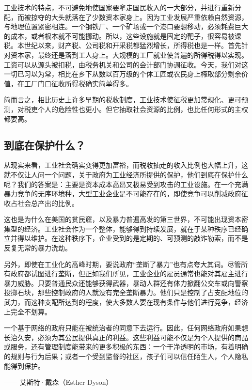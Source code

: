 工业技术的特点，不可避免地使国家要拿走国民收入的一大部分，并进行重新分配，而被掠夺的大头就落在了少数资本家身上。因为工业发展严重依赖自然资源，与地理位置紧密相连。一个钢铁厂、一个矿场或一个港口要想移动，必须耗费巨大的成本，或者根本就不可能挪动。所以，这些设施就是固定的靶子，很容易被课税。本世纪以来，财产税、公司税和开采税都猛烈增长，所得税也是一样。首先针对资本家，最终还是落到工人身上。大规模的工厂就业使普遍的所得税得以实现。工资可以从源头被扣税，由税务机关和公司的会计部门协调征收。今天，我们对这一切已习以为常，相比在乡下从数以百万级的个体工匠或农民身上榨取部分剩余价值，在工厂门口征收所得税确实简单得多。

简而言之，相比历史上许多早期的税收制度，工业技术使征税更加常规化、更可预测，对税吏个人的危险性也更小。但它抽取社会资源的比例，也比任何形式的主权都要高。

\subsection{到底在保护什么？}
从现实来看，工业社会确实变得更加富裕，而税收抽走的收入比例也大幅上升，这就不仅让人问一个问题，关于政府为工业经济所提供的保护，他们到底在保护什么呢？我们的答案是：主要是资本成本高昂又极易受到攻击的工业设施。在一个充满暴力竞争的无序环境种，大型工业企业是不可能存在的，即使竞争可以削减政府征收占社会总产出的比例。

这也是为什么在美国的贫民窟，以及暴力普遍高发的第三世界，不可能出现资本密集型的经济。工业社会作为一个整体，能够得到持续发展，就在于某种秩序已经确立并得以维护。在这种秩序下，企业受到的是定期的、可预测的敲诈勒索，而不是反复无常的暴力洗劫。

另外，即使在工业化的高峰时期，要说政府“垄断了暴力”也有点夸大其词。尽管所有政府都试图进行垄断，但正如我们所见，工业企业的雇员通常也能对其雇主进行暴力威胁。只要普通民众还能够获得武器，暴动人群还有体力掀翻公交车或向警察投掷石块，那些控制政府的人就没有完全垄断暴力。他们只是控制了占支配地位的武力，而这种支配所达到的程度，使大多数人要在现有条件与他们进行竞争，经济上完全不划算。

\begin{tcolorbox}
\kaishu 一个基于网络的政府只能在被统治者的同意下去运行。因此，任何网络政府如果想长治久安，必须为其公民提供真正的利益。这些利益可能不仅是为个人提供的商品或服务，还有管理制度能带来的更多积极的东西：一个干净透明的市场，有着明确的规则与行为后果；或者一个受到监督的社区，孩子们可以信任陌生人，个人隐私能得到保护。
\begin{flushright}
—— 艾斯特·戴森（Esther Dyson）
\end{flushright}
\end{tcolorbox}

